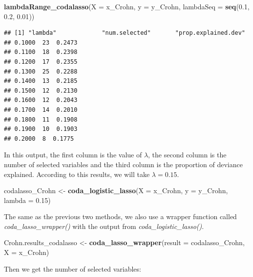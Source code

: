 \documentclass[openany]{book}
\newenvironment{Shaded}{\begin{snugshade}}{\end{snugshade}}
\newcommand{\KeywordTok}[1]{\textcolor[rgb]{0.13,0.29,0.53}{\textbf{#1}}}
\newcommand{\DataTypeTok}[1]{\textcolor[rgb]{0.13,0.29,0.53}{#1}}
\newcommand{\FloatTok}[1]{\textcolor[rgb]{0.00,0.00,0.81}{#1}}
\newcommand{\StringTok}[1]{\textcolor[rgb]{0.31,0.60,0.02}{#1}}
\newcommand{\OperatorTok}[1]{\textcolor[rgb]{0.81,0.36,0.00}{\textbf{#1}}}
\newcommand{\NormalTok}[1]{#1}
\begin{document}
\begin{Shaded}
\begin{Highlighting}[]
\KeywordTok{lambdaRange_codalasso}\NormalTok{(}\DataTypeTok{X =}\NormalTok{ x_Crohn, }\DataTypeTok{y =}\NormalTok{ y_Crohn, }\DataTypeTok{lambdaSeq =} \KeywordTok{seq}\NormalTok{(}\FloatTok{0.1}\NormalTok{, }\FloatTok{0.2}\NormalTok{, }\FloatTok{0.01}\NormalTok{))}
\end{Highlighting}
\end{Shaded}

\begin{verbatim}
## [1] "lambda"             "num.selected"       "prop.explained.dev"
## 0.1000  23  0.2473
## 0.1100  18  0.2398
## 0.1200  17  0.2355
## 0.1300  25  0.2288
## 0.1400  13  0.2185
## 0.1500  12  0.2130
## 0.1600  12  0.2043
## 0.1700  14  0.2010
## 0.1800  11  0.1908
## 0.1900  10  0.1903
## 0.2000  8  0.1775
\end{verbatim}

In this output, the first column is the value of \(\lambda\), the second
column is the number of selected variables and the third column is the
proportion of deviance explained. According to this results, we will
take \(\lambda = 0.15\).

\begin{Shaded}
\begin{Highlighting}[]
\NormalTok{codalasso_Crohn <-}\StringTok{ }\KeywordTok{coda_logistic_lasso}\NormalTok{(}\DataTypeTok{X =}\NormalTok{ x_Crohn, }\DataTypeTok{y =}\NormalTok{ y_Crohn, }\DataTypeTok{lambda =} \FloatTok{0.15}\NormalTok{)}
\end{Highlighting}
\end{Shaded}

The same as the previous two methods, we also use a wrapper function
called \emph{coda\_lasso\_wrapper()} with the output from
\emph{coda\_logistic\_lasso()}.

\begin{Shaded}
\begin{Highlighting}[]
\NormalTok{Crohn.results_codalasso <-}\StringTok{ }\KeywordTok{coda_lasso_wrapper}\NormalTok{(}\DataTypeTok{result =}\NormalTok{ codalasso_Crohn, }\DataTypeTok{X =}\NormalTok{ x_Crohn)}
\end{Highlighting}
\end{Shaded}

Then we get the number of selected variables:

\begin{Shaded}
\end{Shaded}
\end{document}
